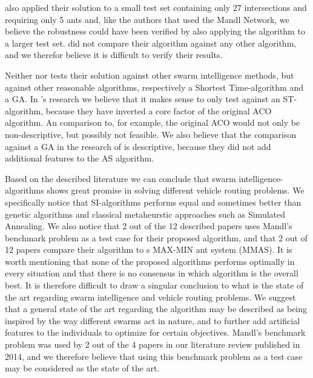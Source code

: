\citet{salehi-nezhad07} also applied their solution to a small test set containing only 27 intersections and requiring only 5 ants and, like the authors that used the Mandl Network, we believe the robustness could have been verified by also applying the algorithm to a larger test set. \citet{salehi-nezhad07} did not compare their algorithm against any other algorithm, and we therefor believe it is difficult to verify their results. 

Neither \citet{dias14} nor \citet{poorzahedy11} tests their solution against other swarm intelligence methods, but against other reasonable algorithms, respectively a Shortest Time-algorithm and a GA. In \citet{dias14}'s research we believe that it makes sense to only test against an ST-algorithm, because they have inverted a core factor of the original ACO algorithm. An comparison to, for example, the original ACO would not only be non-descriptive, but possibly not feasible. We also believe that the comparison against a GA in the research of \citet{poorzahedy11} is descriptive, because they did not add additional features to the AS algorithm. 


Based on the described literature we can conclude that swarm intelligence-algorithms shows great promise in solving different vehicle routing problems. We specifically notice that SI-algorithms performs equal and sometimes better than genetic algorithms and classical metaheurstic approaches such as Simulated Annealing. We also notice that 2 out of the 12 described papers uses Mandl's benchmark problem as a test case for their proposed algorithm, and that 2 out of 12 papers compare their algorithm to \citet{stutzle99}s MAX-MIN ant system (MMAS). It is worth mentioning that none of the proposed algorithms performs optimally in every situation and that there is no consensus in which algorithm is the overall best. It is therefore difficult to draw a singular conclusion to what is the state of the art regarding swarm intelligence and vehicle routing problems. We suggest that a general state of the art regarding the algorithm may be described as being inspired by the way different swarms act in nature, and to further add artificial features to the individuals to optimize for certain objectives. Mandl's benchmark problem was used by 2 out of the 4 papers in our literature review published in 2014, and we therefore believe that using this benchmark problem as a test case may be considered as the state of the art.